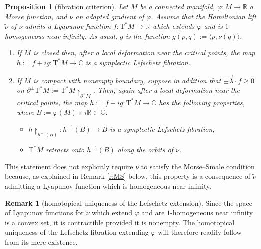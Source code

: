 \documentclass[JEP,XML,SOM,Unicode]{cedram}
\newenvironment{enumeratea}
{\bgroup\def\theenumi{\alph{enumi}}\begin{enumerate}}
{\end{enumerate}\egroup}
\newcommand{\C}{{\mathbb C}}
\newcommand{\R}{{\mathbb R}}
\newcommand{\tu}[1]{\textup{#1}}
\newcommand{\sT}{\mathrm{T}^\ast}
\newcommand{\hnu}{\tilde\nu}
\newcommand{\prg}[1]{\langle #1 \rangle}
\newcommand{\de}{\mathrel{:=}}
\newcommand{\rst}[1]{{\upharpoonright}_{\!#1}}
\let\del\partial
\let\on\colon
\theoremstyle{plain}
\newtheorem{proposition}[theorem]{Proposition}
\theoremstyle{definition}
\newtheorem{remark}[theorem]{Remark}
\begin{document}
\begin{proposition}[fibration criterion] \label{p:g}
Let $M$ be a connected manifold, $\varphi \on M \to \R$ a Morse function, and
$\nu$ an adapted gradient of $\varphi$. Assume that the Hamiltonian lift $\hnu$
of $\nu$ admits a Lyapunov function $f \on \sT M \to \R$ which extends $\varphi$
and is $1$-homogeneous near infinity. As usual, $g$ is the function $g(p,q)
\de \prg{p,\nu(q)}$.
\begin{enumeratea}
\item
If $M$ is closed then, after a local deformation near the critical points, the
map $h \de f+ig \on \sT M \to \C$ is a symplectic Lefschetz fibration.

\item
If $M$ is compact with nonempty boundary, suppose in addition that $\pm\vec
\lambda \cdot f \ge 0$ on $\del^\pm\sT M \de \sT M \rst{ \del^\pm M }$. Then,
again after a local deformation near the critical points, the map $h \de f+ig
\on \sT M \to \C$ has the following properties, where \hbox{$B \de \varphi(M) \times
i\R \subset \C$}\tu:
\begin{itemize}
\item
$h \rst{ h^{-1}(B) } \on h^{-1}(B) \to B$ is a symplectic Lefschetz
fibration\tu;
\item
$\sT M$ retracts onto $h^{-1}(B)$ along the orbits of $\hnu$.
\end{itemize}
\end{enumeratea}
\end{proposition}

This statement does not explicitly require $\nu$ to satisfy the Morse--Smale
condition because, as explained in Remark \ref{r:MS} below, this property is a
consequence of $\hnu$ admitting a Lyapunov function which is homogeneous near
infinity.

\begin{remark}[homotopical uniqueness of the Lefschetz extension] \label{r:one}
Since the space of Lyapunov functions for $\hnu$ which extend $\varphi$ and are
$1$-homogeneous near infinity is a convex set, it is contractible provided it
is nonempty. The homotopical uniqueness of the Lefschetz fibration extending
$\varphi$ will therefore readily follow from its mere existence.
\end{remark}
\end{document}
